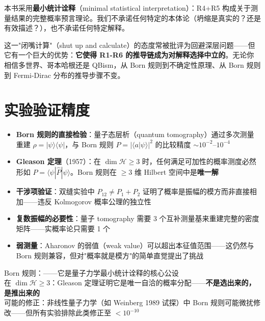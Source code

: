 \begin{insightbox}[本书的立场]
  本书采用\textbf{最小统计诠释}（minimal statistical interpretation）：R4+R5 构成关于测量结果的完整概率预言理论。我们不承诺任何特定的本体论（坍缩是真实的？还是有效描述？），也不承诺任何特定解释。

  这一"闭嘴计算"（shut up and calculate）的态度常被批评为回避深层问题——但它有一个巨大的优势：\textbf{它使得 R1-R6 的推导链成为对解释选择中立的}。无论你相信多世界、哥本哈根还是 QBism，从 Born 规则到不确定性原理、从 Born 规则到 Fermi-Dirac 分布的推导步骤不变。
\end{insightbox}

\section*{实验验证精度}

\begin{oombox}
  \begin{itemize}
    \item \textbf{Born 规则的直接检验}：量子态层析（quantum tomography）通过多次测量重建 $\rho = |\psi\rangle\langle\psi|$，与 Born 规则 $P = |\langle a|\psi\rangle|^2$ 的比较精度 $\sim 10^{-2}$--$10^{-4}$
    \item \textbf{Gleason 定理}（1957）：在 $\dim\mathcal{H}\ge 3$ 时，任何满足可加性的概率测度必然形如 $P = \langle\psi|\hat{P}|\psi\rangle$。Born 规则在 $\ge 3$ 维 Hilbert 空间中是\textbf{唯一解}
    \item \textbf{干涉项验证}：双缝实验中 $P_{12} \neq P_1 + P_2$ 证明了概率是振幅的模方而非直接相加——违反 Kolmogorov 概率公理的独立性
    \item \textbf{复数振幅的必要性}：量子 tomography 需要 3 个互补测量基来重建完整的密度矩阵——实概率论只需要 1 个
    \item \textbf{弱测量}：Aharonov 的弱值（weak value）可以超出本征值范围——这仍然与 Born 规则兼容，但对"概率就是模方"的简单直觉提出了挑战
  \end{itemize}
\end{oombox}

\precisionbox[R5 精度等级]
  Born 规则：\precexact ——它是量子力学最小统计诠释的核心公设\\
  在 $\dim\mathcal{H}\ge 3$：Gleason 定理证明它是唯一自洽的概率分配——\textbf{不是选出来的，是推出来的}\\
  可能的修正：非线性量子力学（如 Weinberg 1989 试探）中 Born 规则可能微扰修改——但所有实验排除此类修正至 $<10^{-10}$
\endprecisionbox

